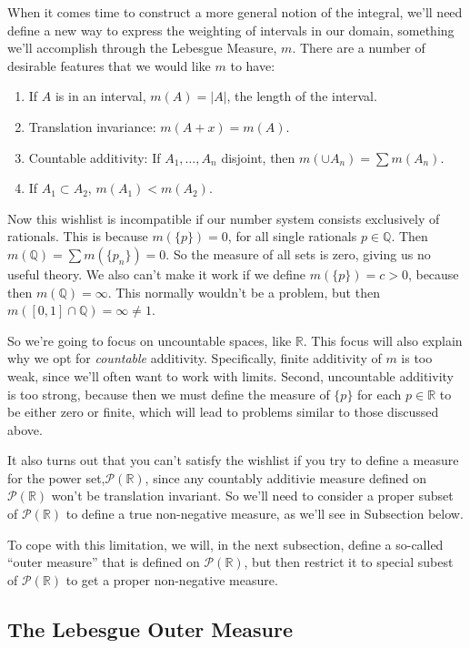 \documentclass[12pt]{article}
\theoremstyle{plain}
\theoremstyle{definition}
\theoremstyle{remark}
\begin{document}
When it comes time to construct a more general notion of the integral, we'll need define a new way to express the weighting of intervals in our domain, something we'll accomplish through the Lebesgue Measure, $m$. There are a number of desirable features that we would like $m$ to have:
\begin{enumerate}
    \item If $A$ is in an interval, $m(A) = |A|$, the length of the interval.
    \item Translation invariance: $m(A+x) = m(A)$.
    \item Countable additivity: If $A_1, \ldots, A_n$ disjoint, then $m(\cup A_n) = \sum m(A_n)$. 
    \item If $A_1 \subset A_2$, $m(A_1) < m(A_2)$.
\end{enumerate}
Now this wishlist is incompatible if our number system consists exclusively of rationals. This is because $m(\{p\}) = 0$, for all single rationals $p\in\mathbb{Q}$. Then $m(\mathbb{Q})=\sum m(\{p_n\}) = 0$. So the measure of all sets is zero, giving us no useful theory. We also can't make it work if we define $m(\{p\})=c>0$, because then $m(\mathbb{Q})=\infty$. This normally wouldn't be a problem, but then $m([0,1]\cap \mathbb{Q}) = \infty \neq 1$. 

So we're going to focus on uncountable spaces, like $\mathbb{R}$. This focus will also explain why we opt for \emph{countable} additivity. Specifically, finite additivity of $m$ is too weak, since we'll often want to work with limits. Second, uncountable additivity is too strong, because then we must define the measure of $\{p\}$ for each $p\in\mathbb{R}$ to be either zero or finite, which will lead to problems similar to those discussed above.

It also turns out that you can't satisfy the wishlist if you try to define a measure for the power set,$\mathscr{P}(\mathbb{R})$, since any countably additivie measure defined on $\mathscr{P}(\mathbb{R})$ won't be translation invariant.  So we'll need to consider a proper subset of $\mathscr{P}(\mathbb{R})$ to define a true non-negative measure, as we'll see in Subsection {} below.

To cope with this limitation, we will, in the next subsection, define a so-called ``outer measure'' that is defined on $\mathscr{P}(\mathbb{R})$, but then restrict it to special subest of $\mathscr{P}(\mathbb{R})$ to get a proper non-negative measure.


\newpage
\subsection{The Lebesgue Outer Measure}
\end{document}
